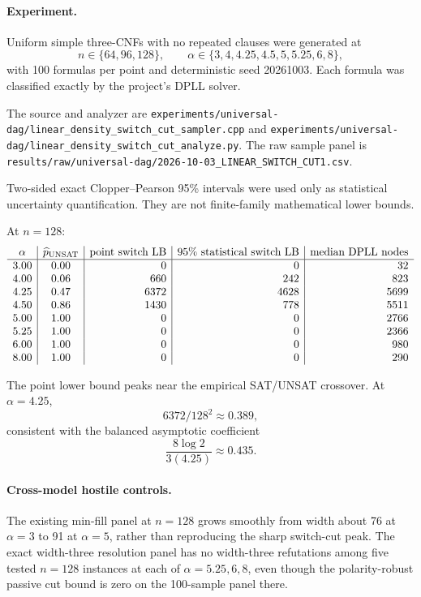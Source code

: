 \paragraph{Experiment.}
Uniform simple three-CNFs with no repeated clauses were generated at
\[
n\in\{64,96,128\},
\qquad
\alpha\in\{3,4,4.25,4.5,5,5.25,6,8\},
\]
with 100 formulas per point and deterministic seed 20261003. Each formula was classified exactly
by the project's DPLL solver.

The source and analyzer are
\texttt{experiments/universal-dag/linear\_density\_switch\_cut\_sampler.cpp}
and
\texttt{experiments/universal-dag/linear\_density\_switch\_cut\_analyze.py}.
The raw sample panel is
\texttt{results/raw/universal-dag/2026-10-03\_LINEAR\_SWITCH\_CUT1.csv}.

Two-sided exact Clopper--Pearson 95\% intervals were used only as statistical uncertainty
quantification. They are not finite-family mathematical lower bounds.

At \(n=128\):
\[
\begin{array}{c|c|r|r|r}
\alpha & \widehat p_{\rm UNSAT}
&\text{point switch LB}
&\text{95\% statistical switch LB}
&\text{median DPLL nodes}\\
\hline
3.00&0.00&0&0&32\\
4.00&0.06&660&242&823\\
4.25&0.47&6372&4628&5699\\
4.50&0.86&1430&778&5511\\
5.00&1.00&0&0&2766\\
5.25&1.00&0&0&2366\\
6.00&1.00&0&0&980\\
8.00&1.00&0&0&290
\end{array}
\]

The point lower bound peaks near the empirical SAT/UNSAT crossover. At \(\alpha=4.25\),
\[
6372/128^2\approx0.389,
\]
consistent with the balanced asymptotic coefficient
\[
\frac{8\log2}{3(4.25)}\approx0.435.
\]

\paragraph{Cross-model hostile controls.}
The existing min-fill panel at \(n=128\) grows smoothly from width about 76 at \(\alpha=3\)
to 91 at \(\alpha=5\), rather than reproducing the sharp switch-cut peak.
The exact width-three resolution panel has no width-three refutations among five tested
\(n=128\) instances at each of \(\alpha=5.25,6,8\), even though the polarity-robust passive
cut bound is zero on the 100-sample panel there.

